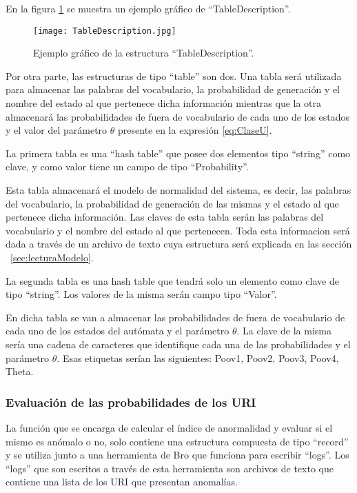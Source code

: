 En la figura \ref{fig:TableDescription} se muestra un ejemplo gráfico de ``TableDescription''.

\begin{figure}[tb]
\begin{center}
\texttt{[image: TableDescription.jpg]}
\caption{Ejemplo gráfico de la estructura ``TableDescription''.}
\label{fig:TableDescription}
\end{center}
\end{figure}	

Por otra parte, las estructuras de tipo ``table'' son dos. Una tabla será utilizada para almacenar las palabras del vocabulario, la probabilidad de generación y el nombre del estado al que pertenece dicha información mientras que la otra almacenará las probabilidades de fuera de vocabulario de cada uno de los estados y el valor del parámetro $\theta$ presente en la expresión \ref{eq:ClaseU}.

La primera tabla es una ``hash table'' que posee dos elementos tipo ``string'' como clave, y como valor tiene un campo de tipo ``Probability''.

Esta tabla almacenará el modelo de normalidad del sistema, es decir, las palabras del vocabulario, la probabilidad de generación de las mismas y el estado al que pertenece dicha información. Las claves de esta tabla serán las palabras del vocabulario y el nombre del estado al que pertenecen. Toda esta informacion será dada a través de un archivo de texto cuya estructura será explicada en las sección ~\ref{sec:lecturaModelo}.

La segunda tabla es una hash table que tendrá solo un elemento como clave de tipo ``string''. Los valores de la misma serán campo tipo ``Valor''. 

En dicha tabla se van a almacenar las probabilidades de fuera de vocabulario de cada uno de los estados del autómata y el parámetro $\theta$. La clave de la misma sería una cadena de caracteres que identifique cada una de las probabilidades  y el parámetro  $\theta$. Esas etiquetas serían las siguientes: Poov1, Poov2, Poov3, Poov4, Theta.  

\subsubsection*{Evaluación de las probabilidades de los URI}
\label{sssec:estructuraEvaluacion}

La función  que se encarga de calcular el índice de anormalidad  y evaluar si el mismo es anómalo o no, solo contiene una estructura compuesta de tipo ``record'' y se utiliza junto a una herramienta de Bro que funciona para escribir ``logs''. Los ``logs'' que son escritos a través de esta herramienta son archivos de texto que contiene una lista de los URI que presentan anomalías.

